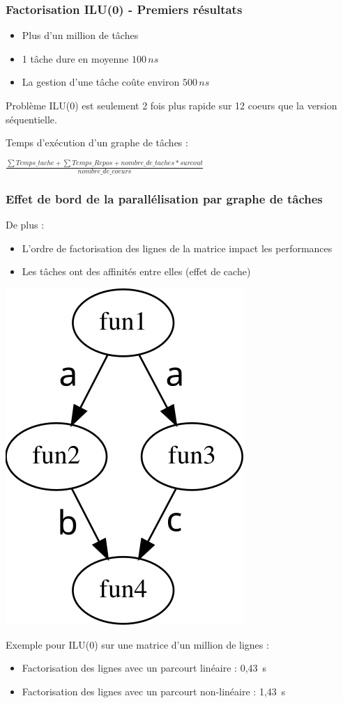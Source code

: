 \documentclass{beamer}
\begin{document}
\begin{frame}
  \frametitle{Factorisation ILU(0) - Premiers résultats}

  \begin{itemize}
        \item Plus d'un million de tâches
        \item 1 tâche dure en moyenne $100\,ns$
        \item La gestion d'une tâche coûte environ $500\,ns$
  \end{itemize}

  \begin{alertblock}{Problème}
    ILU(0) est seulement 2 fois plus rapide sur 12 coeurs que la version séquentielle.
  \end{alertblock}
  \pause
  Temps d'exécution d'un graphe de tâches :

  \bigskip

  $\frac{\sum Temps\_tache + \sum Temps\_Repos + nombre\_de\_taches * surcout}{nombre\_de\_coeurs}$
\end{frame}

\begin{frame}
  \frametitle{Effet de bord de la parallélisation par graphe de tâches}

  De plus :
  \begin{itemize}
    \item L'ordre de factorisation des lignes de la matrice impact les performances
    \item Les tâches ont des affinités entre elles (effet de cache)
  \end{itemize}

  \centerline{\includegraphics[width=0.15\linewidth]{agg_exemple}}

  Exemple pour ILU(0) sur une matrice d'un million de lignes :
  \begin{itemize}
    \item Factorisation des lignes avec un parcourt linéaire : 0,43~s
    \item Factorisation des lignes avec un parcourt non-linéaire : 1,43~s
  \end{itemize}


\end{frame}
\end{document}
